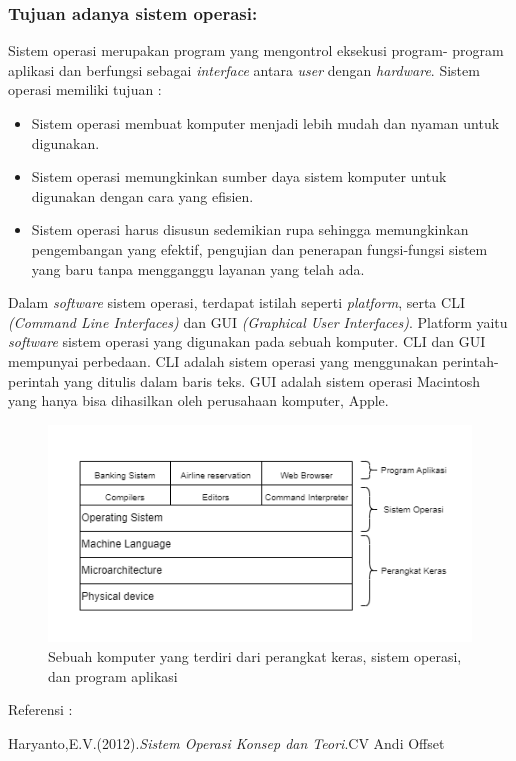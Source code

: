 \documentclass[12pt]{article}
\begin{document}
\subsubsection *{Tujuan adanya sistem operasi:}
Sistem operasi merupakan program yang mengontrol eksekusi program- program aplikasi dan berfungsi sebagai \textit{interface} antara \textit{user} dengan \textit{hardware}. Sistem operasi memiliki tujuan :
\begin{itemize}
    \item Sistem operasi membuat komputer menjadi lebih mudah dan nyaman untuk digunakan.
    \item Sistem operasi memungkinkan sumber daya sistem komputer untuk digunakan dengan cara yang efisien.
    \item Sistem operasi harus disusun sedemikian rupa sehingga memungkinkan pengembangan yang efektif, pengujian dan penerapan fungsi-fungsi sistem yang baru tanpa mengganggu layanan yang telah ada.
\end{itemize}
Dalam \textit{software} sistem operasi, terdapat istilah seperti \textit{platform}, serta CLI \textit{(Command Line Interfaces)} dan GUI \textit{(Graphical User Interfaces)}. Platform yaitu \textit{software} sistem operasi yang digunakan pada sebuah komputer. CLI dan GUI mempunyai perbedaan. CLI adalah sistem operasi yang menggunakan perintah-perintah yang ditulis dalam baris teks. GUI adalah sistem operasi Macintosh yang hanya bisa dihasilkan oleh perusahaan komputer, Apple.
\begin{figure}[h]
		\centering
		\includegraphics[width=1\textwidth]{asset/sistemoperasi.png}
		\caption{Sebuah komputer yang terdiri dari perangkat keras, sistem operasi, dan program aplikasi} 
		\label{fig:contoh_gambar}
	\end{figure}
    \item Referensi :
    \item Haryanto,E.V.(2012).\textit{Sistem Operasi Konsep dan Teori}.CV Andi Offset
\end{document}
